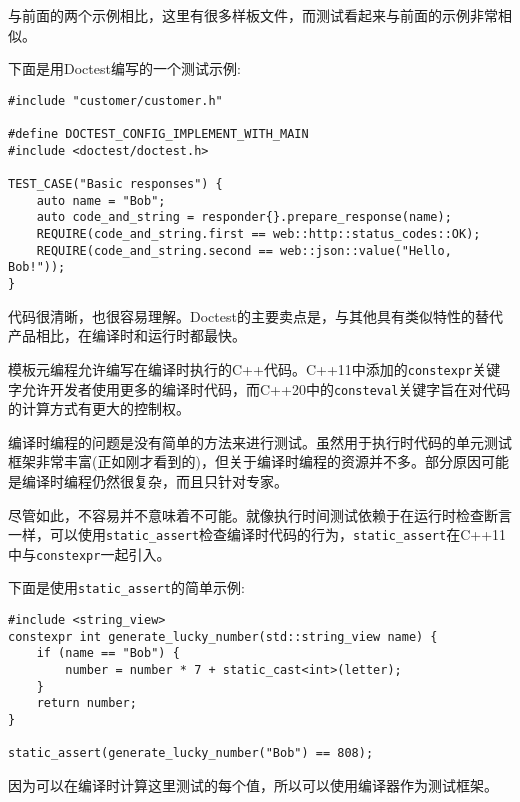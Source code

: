 与前面的两个示例相比，这里有很多样板文件，而测试看起来与前面的示例非常相似。


下面是用Doctest编写的一个测试示例:

\begin{lstlisting}[style=styleCXX]
#include "customer/customer.h"

#define DOCTEST_CONFIG_IMPLEMENT_WITH_MAIN
#include <doctest/doctest.h>

TEST_CASE("Basic responses") {
	auto name = "Bob";
	auto code_and_string = responder{}.prepare_response(name);
	REQUIRE(code_and_string.first == web::http::status_codes::OK);
	REQUIRE(code_and_string.second == web::json::value("Hello, Bob!"));
}
\end{lstlisting}

代码很清晰，也很容易理解。Doctest的主要卖点是，与其他具有类似特性的替代产品相比，在编译时和运行时都最快。


模板元编程允许编写在编译时执行的C++代码。C++11中添加的\texttt{constexpr}关键字允许开发者使用更多的编译时代码，而C++20中的\texttt{consteval}关键字旨在对代码的计算方式有更大的控制权。

编译时编程的问题是没有简单的方法来进行测试。虽然用于执行时代码的单元测试框架非常丰富(正如刚才看到的)，但关于编译时编程的资源并不多。部分原因可能是编译时编程仍然很复杂，而且只针对专家。

尽管如此，不容易并不意味着不可能。就像执行时间测试依赖于在运行时检查断言一样，可以使用\texttt{static\_assert}检查编译时代码的行为，\texttt{static\_assert}在C++11中与\texttt{constexpr}一起引入。

下面是使用\texttt{static\_assert}的简单示例:

\begin{lstlisting}[style=styleCXX]
#include <string_view>
constexpr int generate_lucky_number(std::string_view name) {
	if (name == "Bob") {
		number = number * 7 + static_cast<int>(letter);
	}
	return number;
}

static_assert(generate_lucky_number("Bob") == 808);
\end{lstlisting}

因为可以在编译时计算这里测试的每个值，所以可以使用编译器作为测试框架。











